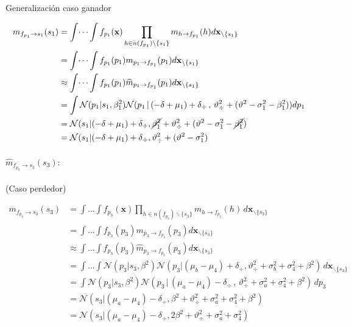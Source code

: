 \documentclass[11pt,twoside,spanish]{report} %
\begin{document}
Generalizaci\'on caso ganador

\begin{equation}
	\begin{split}
		m_{f_{p_1} \rightarrow s_1}(s_1) & = \int \dots \int f_{p_1}(\textbf{x}) \prod_{h \in n(f_{p_1}) \backslash \{s_1\} } m_{h \rightarrow f_{p_1}}(h)  d\textbf{x}_{\backslash \{s_1\} }  \\
		&= \int \dots \int f_{p_1}(p_1)m_{p_1 \rightarrow f_{p_1}}(p_1) d\textbf{x}_{\backslash \{s_1\} }  \\
		&\approx \int \dots \int f_{p_1}(p_1)\widehat{m}_{p_1 \rightarrow f_{p_1}}(p_1)d\textbf{x}_{\backslash \{s_1\} }  \\
		&=\int  \mathcal{N}(p_1| s_1, \beta_1^2) \mathcal{N}( p_1 \,|\, (-\delta + \mu_1) + \delta_{\div}  \,,\,\vartheta_{\div}^2 + (\vartheta^2 - \sigma_1^2 - \beta_1^2))dp_1\\
		&=  \mathcal{N}( s_1| (-\delta + \mu_1) + \delta_{\div} , \cancel{\beta_1^2}+\vartheta_{\div}^2 + (\vartheta^2 - \sigma_1^2 - \cancel{\beta_1^2}) \\
		&=  \mathcal{N}( s_1| (-\delta + \mu_1) + \delta_{\div} ,\vartheta_{\div}^2 + (\vartheta^2 - \sigma_1^2 )
	\end{split}
\end{equation}
\paragraph{$\widehat{m}_{f_{p_3} \rightarrow s_3}(s_3):$}(Caso perdedor)

\begin{equation}
	\begin{split}
		m_{f_{p_3} \rightarrow s_3}(s_3) & = \int \dots \int f_{p_3}(\textbf{x}) \prod_{h \in n(f_{p_3}) \backslash \{s_3\} } m_{h \rightarrow f_{p_3}}(h) \, d\textbf{x}_{\backslash \{s_3\} }  \\
		&= \int \dots \int f_{p_3}(p_3)m_{p_3 \rightarrow f_{p_3}}(p_3) d\textbf{x}_{\backslash \{s_3\} }  \\
		&\approx \int \dots \int f_{p_3}(p_3)\widehat{m}_{p_3 \rightarrow f_{p_3}}(p_3) d\textbf{x}_{\backslash \{s_3\} }  \\
		&= \int \dots \int \mathcal{N}(p_3| s_3, \beta^2)  \mathcal{N}( p_3 |  (\mu_b - \mu_4) + \delta_{\div},\vartheta_{\div}^2 + \sigma_b^2 + \sigma_4^2 + \beta^2) \, d\textbf{x}_{\backslash \{s_3\} }\\
		& = \int \mathcal{N}(p_3| s_3, \beta^2) \mathcal{N}( p_3 \,|\,  (\mu_a - \mu_4) - \delta_{\div}  \,,\,\vartheta_{\div}^2 + \sigma_a^2 + \sigma_4^2 + \beta^2) \, dp_3 \\
		& = \mathcal{N}(s_3|(\mu_a - \mu_4) - \delta_{\div}, \beta^2+\vartheta_{\div}^2 + \sigma_a^2 + \sigma_4^2+ \beta^2) \\
		& = \mathcal{N}(s_3|(\mu_a - \mu_4) - \delta_{\div}, 2\beta^2+\vartheta_{\div}^2 + \sigma_a^2 + \sigma_4^2 )
	\end{split}
\end{equation}
\end{document}
